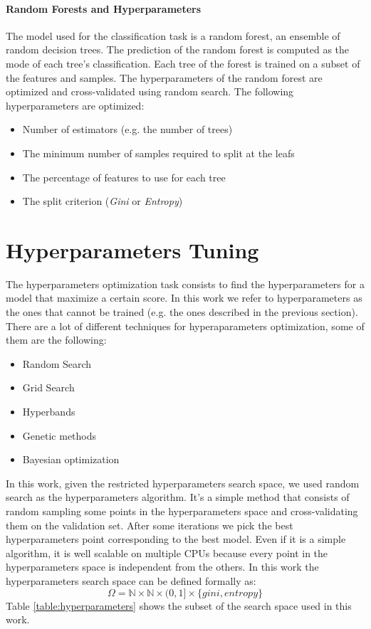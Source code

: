 \documentclass[11pt, a4paper]{article}
\begin{document}
\begin{multicols}{2}
  \paragraph{Random Forests and Hyperparameters}
    The model used for the classification task is a random forest, an ensemble of random decision trees. The prediction of the random forest is computed as the mode of each tree's classification. Each tree of the forest is trained on a subset of the features and samples.
    The hyperparameters of the random forest are optimized and cross-validated using random search. The following hyperparameters are optimized:
    \begin{itemize}
      \item Number of estimators (e.g. the number of trees)
      \item The minimum number of samples required to split at the leafs
      \item The percentage of features to use for each tree
      \item The split criterion (\textit{Gini} or \textit{Entropy})
    \end{itemize}

\section{Hyperparameters Tuning}
  The hyperparameters optimization task consists to find the hyperparameters for a model that maximize a certain score. In this work we refer to hyperparameters as the ones that cannot be trained (e.g. the ones described in the previous section).
  There are a lot of different techniques for hyperaparameters optimization, some of them are the following:
  \begin{itemize}
    \item Random Search
    \item Grid Search
    \item Hyperbands
    \item Genetic methods
    \item Bayesian optimization
  \end{itemize}
  In this work, given the restricted hyperparameters search space, we used random search as the hyperparameters algorithm. It's a simple method that consists of random sampling some points in the hyperparameters space and cross-validating them on the validation set. After some iterations we pick the best hyperparameters point corresponding to the best model.
  Even if it is a simple algorithm, it is well scalable on multiple CPUs because every point in the hyperparameters space is independent from the others.
  In this work the hyperparameters search space can be defined formally as:
  \[\Omega=\mathbb{N}\times\mathbb{N}\times(0,1]\times\{gini, entropy\}\]
  Table \ref{table:hyperparameters} shows the subset of the search space used in this work.
  

\end{multicols}
\end{document}
